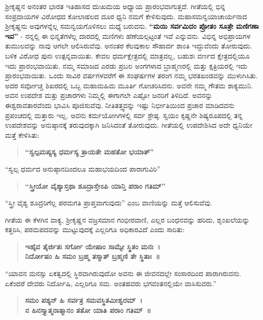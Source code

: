 ಶ‍್ರೀಕೃಷ್ಣನ ಅನಂತರ ಭಾರತ ಇತಿಹಾಸದ ದುಃಖಮಯ ಅಧ್ಯಾಯ ಪ್ರಾರಂಭವಾಗುತ್ತದೆ. ಗೀತೆಯಲ್ಲಿ ಭಿನ್ನ ಸಂಪ್ರದಾಯಗಳ ವಿರೋಧದ ಕೋಲಾಹಲದ ದೂರ ಧ್ವನಿ ನಮಗೆ ಕೇಳಿಸುವುದು. ಮಹಾಸಮನ್ವಯಾಚಾರ್ಯನಾದ ಶ‍್ರೀಕೃಷ್ಣನು ಅವುಗಳನ್ನೆಲ್ಲ ಸಮನ್ವಯಗೊಳಿಸಲು ಮಧ್ಯೆ ಬರುವನು. \textbf{“ಮಯಿ ಸರ್ವಮಿದಂ ಪ್ರೋತಂ ಸೂತ್ರೇ ಮಣಿಗಣಾ ಇವ”} - ನನ್ನಲ್ಲಿ ಈ ಭಿನ್ನತೆಗಳೆಲ್ಲ ದಾರದಲ್ಲಿ ಮಣಿಗಳು ಹೆಣೆಯಲ್ಪಟ್ಟಂತೆ ಇವೆ ಎನ್ನುವನು. ವಿಭಿನ್ನ ಅಭಿಪ್ರಾಯಗಳ ತುಮುಲವನ್ನು ನಾವು ಆಗಲೇ ಆಲಿಸಿರುವೆವು. ಅನಂತರ ಕೆಲವುಕಾಲ ಸೌಹಾರ್ದ ಶಾಂತಿ ಇದ್ದುವೆಂದು ತೋರುವುದು. ಬಳಿಕ ವಿರೋಧ ಪುನಃ ಉತ್ಪನ್ನವಾಯಿತು. ಕೇವಲ ಧರ್ಮಕ್ಷೇತ್ರದಲ್ಲಿ ಮಾತ್ರವಲ್ಲ, ಬಹುಶಃ ವರ್ಣದ ಕ್ಷೇತ್ರದಲ್ಲಿಯೂ ಇದು ಪ್ರಾರಂಭವಾಯಿತು. ನಮ್ಮ ಸಮಾಜದ ಎರಡು ಪ್ರಬಲ ಅಂಗಗಳಾದ ಬ್ರಾಹ್ಮಣರಲ್ಲಿ ಮತ್ತು ಕ್ಷತ್ರಿಯರಲ್ಲಿ ಇದು ಪ್ರಾರಂಭವಾಯಿತು. ಒಂದು ಸಾವಿರ ವರ್ಷಗಳವರೆಗೆ ಈ ಸಂಘರ್ಷಗಳ ತರಂಗ ನಮ್ಮ ಭರತಖಂಡವನ್ನು ಮುಳುಗಿಸಿತು. ಅದರ ಸರ್ವೋಚ್ಚ ಶಿಖರದಲ್ಲಿ ಒಬ್ಬ ಮಹಾಮಹಿಮ ಮೂರ್ತಿ ಗೋಚರಿಸಿದನು. ಅವನೇ ನಮ್ಮ ಗೌತಮ ಶಾಕ್ಯಮುನಿ. ಅವನ ಉಪದೇಶ ಮತ್ತು ಪ್ರಚಾರಗಳು ನಿಮ್ಮಲ್ಲಿ ಈಗಾಗಲೇ ಎಷ್ಟೋ ಜನರಿಗೆ ತಿಳಿದಿದೆ. ಅವನನ್ನು ಈಶ್ವರಾವತಾರವೆಂದು ಭಾವಿಸಿ ಪೂಜಿಸುವೆವು. ನೀತಿತತ್ತ್ವವನ್ನು ಇಷ್ಟು ನಿರ್ಭೀತಿಯಿಂದ ಪ್ರಚಾರ ಮಾಡಿದವನು ಪ್ರಪಂಚದಲ್ಲಿ ಮತ್ತಾರು ಇಲ್ಲ. ಅವನು ಕರ್ಮಯೋಗಿಗಳಲ್ಲಿ ಸರ್ವ ಶ್ರೇಷ್ಠ. ಸ್ವಯಂ ಕೃಷ್ಣನೇ ಶಿಷ್ಯರೂಪದಲ್ಲಿ ತನ್ನ ಉಪದೇಶವನ್ನು ಅನುಷ್ಠಾನಕ್ಕೆ ತರುವುದಕ್ಕಾಗಿ ಜನಿಸಿದಂತೆ ತೋರುವುದು. ಗೀತೆಯಲ್ಲಿ ಉಪದೇಶಿಸಿದ ಅದೇ ಧ್ವನಿಯೇ ಮತ್ತೆ ಕೇಳಿಸಿತು:

\begin{verse}
\textbf{“ಸ್ವಲ್ಪಮಪ್ಯಸ್ಯ ಧರ್ಮಸ್ಯ ತ್ರಾಯತೇ ಮಹತೋ ಭಯಾತ್​”}
\end{verse}

“ಸ್ವಲ್ಪ ಧರ್ಮದ ಅನುಷ್ಠಾನದಿಂದಲೂ ಮಹಾಭಯದಿಂದ ಪಾರಾಗುವಿರಿ”

\begin{verse}
\textbf{“ಸ್ತ್ರೀಯೋ ವೈಶ್ಯಾಸ್ತಥಾ ಶೂದ್ರಾಸ್ತೇಽಪಿ ಯಾನ್ತಿ ಪರಾಂ ಗತಿಮ್”​}
\end{verse}

“ಸ್ತ್ರೀ ವೈಶ್ಯ ಶೂದ್ರರಿಗೆಲ್ಲ ಪರಮಗತಿ ಪ್ರಾಪ್ತವಾಗುವುದು” ಎಂಬ ವಾಣಿಯನ್ನು ಮತ್ತೆ ಆಲಿಸುವೆವು.

ಗೀತೆಯ ಈ ಕೆಳಗಿನ ವಾಕ್ಯ, ಶ‍್ರೀಕೃಷ್ಣನ ವಜ್ರಸಮಾನ ಗಂಭೀರವಾಣಿ, ಎಲ್ಲರ ಬಂಧನವನ್ನು ಹರಿದು, ಶೃಂಖಲೆಯನ್ನು ಕತ್ತರಿಸಿ, ಪರಮಪದವನ್ನು ಮುಟ್ಟುವುದಕ್ಕೆ ಎಲ್ಲರಿಗೂ ಅಧಿಕಾರವಿದೆ ಎಂದು ಸಾರಿತು:

\begin{verse}
\textbf{ಇಹೈವ ತೈರ್ಜಿತಃ ಸರ್ಗೋ ಯೇಷಾಂ ಸಾಮ್ಯೇ ಸ್ಥಿತಂ ಮನಃ~।}\\\textbf{ನಿರ್ದೋಷಂ ಹಿ ಸಮಂ ಬ್ರಹ್ಮ ತಸ್ಮಾತ್​ ಬ್ರಹ್ಮಣಿ ತೇ ಸ್ಥಿತಾಃ~॥}
\end{verse}

“ಯಾವನ ಮನಸ್ಸು ಏಕತ್ವದಲ್ಲಿ ಸ್ಥಿರವಾಗಿರುವುದೋ ಅವನು ಈ ಜೀವನದಲ್ಲೇ ಸಂಸಾರದಿಂದ ಪಾರಾಗಿರುವನು. ಏಕೆಂದರೆ ದೇವರು ನಿರ್ದೋಷಿ, ಎಲ್ಲರಿಗೂ ಸಮ. ಅಂತಹವರು ಭಗವಂತನಲ್ಲಿಯೇ ವಾಸಿಸುವರು.”

\begin{verse}
\textbf{ಸಮಂ ಪಶ್ಯನ್​ ಹಿ ಸರ್ವತ್ರ ಸಮವಸ್ಥಿತಮೀಶ್ವರಮ್​~।}\\\textbf{ನ ಹಿನಸ್ತ್ಯಾತ್ಮನಾತ್ಮಾನಂ ತತೋ ಯಾತಿ ಪರಾಂ ಗತಿಮ್​~॥}
\end{verse}

